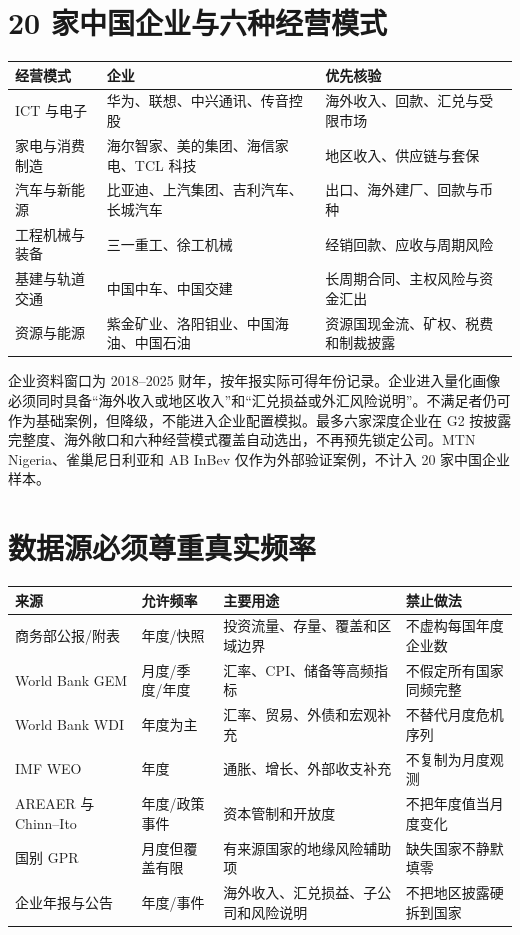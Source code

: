 \documentclass[UTF8,12pt,openany]{ctexbook}
\begin{document}
\section{20 家中国企业与六种经营模式}
\begin{longtable}{p{3.1cm}p{7.4cm}p{3.7cm}}
\toprule
\textbf{经营模式} & \textbf{企业} & \textbf{优先核验}\\
\midrule
ICT 与电子 & 华为、联想、中兴通讯、传音控股 & 海外收入、回款、汇兑与受限市场\\
家电与消费制造 & 海尔智家、美的集团、海信家电、TCL 科技 & 地区收入、供应链与套保\\
汽车与新能源 & 比亚迪、上汽集团、吉利汽车、长城汽车 & 出口、海外建厂、回款与币种\\
工程机械与装备 & 三一重工、徐工机械 & 经销回款、应收与周期风险\\
基建与轨道交通 & 中国中车、中国交建 & 长周期合同、主权风险与资金汇出\\
资源与能源 & 紫金矿业、洛阳钼业、中国海油、中国石油 & 资源国现金流、矿权、税费和制裁披露\\
\bottomrule
\end{longtable}

企业资料窗口为 2018--2025 财年，按年报实际可得年份记录。企业进入量化画像必须同时具备“海外收入或地区收入”和“汇兑损益或外汇风险说明”。不满足者仍可作为基础案例，但降级，不能进入企业配置模拟。最多六家深度企业在 G2 按披露完整度、海外敞口和六种经营模式覆盖自动选出，不再预先锁定公司。MTN Nigeria、雀巢尼日利亚和 AB InBev 仅作为外部验证案例，不计入 20 家中国企业样本。

\section{数据源必须尊重真实频率}
\begin{longtable}{p{3.1cm}p{3.0cm}p{4.5cm}p{3.6cm}}
\toprule
\textbf{来源} & \textbf{允许频率} & \textbf{主要用途} & \textbf{禁止做法}\\
\midrule
商务部公报/附表 & 年度/快照 & 投资流量、存量、覆盖和区域边界 & 不虚构每国年度企业数\\
World Bank GEM & 月度/季度/年度 & 汇率、CPI、储备等高频指标\autocite{worldbankgem} & 不假定所有国家同频完整\\
World Bank WDI & 年度为主 & 汇率、贸易、外债和宏观补充\autocite{worldbankapi} & 不替代月度危机序列\\
IMF WEO & 年度 & 通胀、增长、外部收支补充\autocite{imfweo} & 不复制为月度观测\\
AREAER 与 Chinn--Ito & 年度/政策事件 & 资本管制和开放度\autocite{imfareaer,chinnito2023} & 不把年度值当月度变化\\
国别 GPR & 月度但覆盖有限 & 有来源国家的地缘风险辅助项\autocite{bdegpr2025} & 缺失国家不静默填零\\
企业年报与公告 & 年度/事件 & 海外收入、汇兑损益、子公司和风险说明 & 不把地区披露硬拆到国家\\
\bottomrule
\end{longtable}
\end{document}
